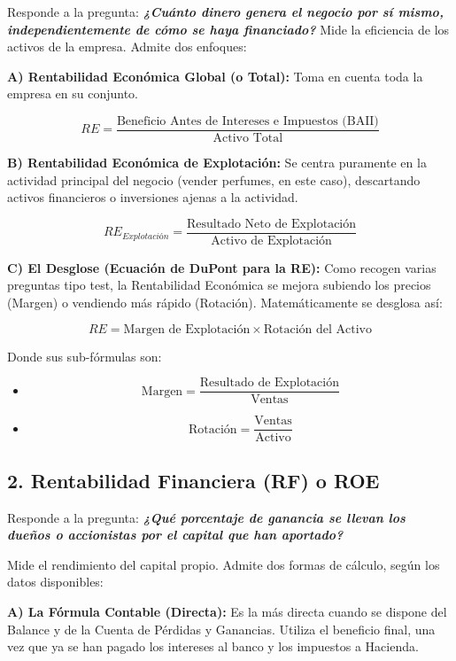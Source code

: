 \documentclass[12pt]{book} %
\begin{document}
Responde a la pregunta: \textbf{\emph{¿Cuánto dinero genera el negocio
por sí mismo, independientemente de cómo se haya financiado?}} Mide la
eficiencia de los activos de la empresa. Admite dos enfoques:

\textbf{A) Rentabilidad Económica Global (o Total):} Toma en cuenta toda
la empresa en su conjunto.

\[RE = \frac{\text{Beneficio Antes de Intereses e Impuestos (BAII)}}{\text{Activo Total}}\]

\textbf{B) Rentabilidad Económica de Explotación:} Se centra puramente
en la actividad principal del negocio (vender perfumes, en este caso),
descartando activos financieros o inversiones ajenas a la actividad.

\[RE_{Explotación} = \frac{\text{Resultado Neto de Explotación}}{\text{Activo de Explotación}}\]

\textbf{C) El Desglose (Ecuación de DuPont para la RE):} Como recogen
varias preguntas tipo test, la Rentabilidad Económica se mejora subiendo
los precios (Margen) o vendiendo más rápido (Rotación). Matemáticamente
se desglosa así:

\[RE = \text{Margen de Explotación} \times \text{Rotación del Activo}\]

Donde sus sub-fórmulas son:

\begin{itemize}
\item
  \[\text{Margen} = \frac{\text{Resultado de Explotación}}{\text{Ventas}}\]
\item
  \[\text{Rotación} = \frac{\text{Ventas}}{\text{Activo}}\]
\end{itemize}

\hypertarget{rentabilidad-financiera-rf-o-roe}{%
\subsection{2. Rentabilidad Financiera (RF) o
ROE}\label{rentabilidad-financiera-rf-o-roe}}

Responde a la pregunta: \textbf{\emph{¿Qué porcentaje de ganancia se
llevan los dueños o accionistas por el capital que han aportado?}}

Mide el rendimiento del capital propio. Admite dos formas de cálculo,
según los datos disponibles:

\textbf{A) La Fórmula Contable (Directa):} Es la más directa cuando se
dispone del Balance y de la Cuenta de Pérdidas y Ganancias. Utiliza el
beneficio final, una vez que ya se han pagado los intereses al banco y
los impuestos a Hacienda.
\end{document}
